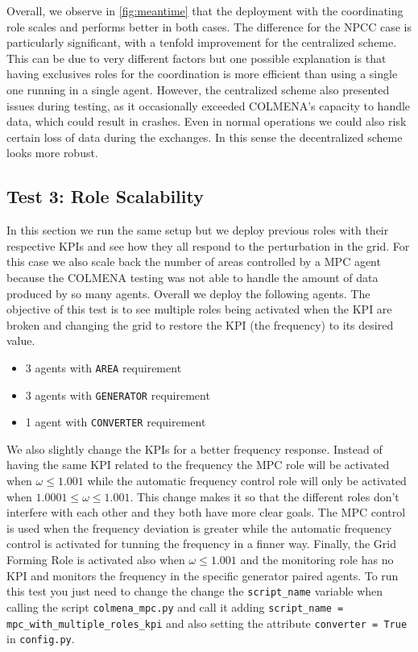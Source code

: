 \documentclass{article}
\begin{document}
Overall, we observe in \ref{fig:meantime} that the deployment with the coordinating role scales and performs better in both cases. The difference for the NPCC case is particularly significant, with a tenfold improvement for the centralized scheme. This can be due to very different factors but one possible explanation is that having exclusives roles for the coordination is more efficient than using a single one running in a single agent. However, the centralized scheme also presented issues during testing, as it occasionally exceeded COLMENA's capacity to handle data, which could result in crashes. Even in normal operations we could also risk certain loss of data during the exchanges. In this sense the decentralized scheme looks more robust. 

\subsection*{Test 3: Role Scalability}

In this section we run the same setup but we deploy previous roles with their respective KPIs and see how they all respond to the perturbation in the grid. For this case we also scale back the number of areas controlled by a MPC agent because the COLMENA testing was not able to handle the amount of data produced by so many agents. Overall we deploy the following agents. The objective of this test is to see multiple roles being activated when the KPI are broken and changing the grid to restore the KPI (the frequency) to its desired value.

\begin{itemize}
\item 3 agents with \texttt{AREA} requirement
\item 3 agents with \texttt{GENERATOR} requirement
\item 1 agent with \texttt{CONVERTER} requirement
\end{itemize}

We also slightly change the KPIs for a better frequency response. Instead of having the same KPI related to the frequency the MPC role will be activated when $\omega \leq 1.001$ while the automatic frequency control role will only be activated when $1.0001 \leq \omega \leq 1.001$. This change makes it so that the different roles don't interfere with each other and they both have more clear goals. The MPC control is used when the frequency deviation is greater while the automatic frequency control is activated for tunning the frequency in a finner way. Finally, the Grid Forming Role is activated also when $\omega \leq 1.001$  and the monitoring role has no KPI and monitors the frequency in the specific generator paired agents. To run this test you just need to change the change the \texttt{script\_name} variable when calling the script \texttt{colmena\_mpc.py} and call it adding \texttt{script\_name = mpc\_with\_multiple\_roles\_kpi} and also setting the attribute \texttt{converter = True} in \texttt{config.py}. 
\end{document}
